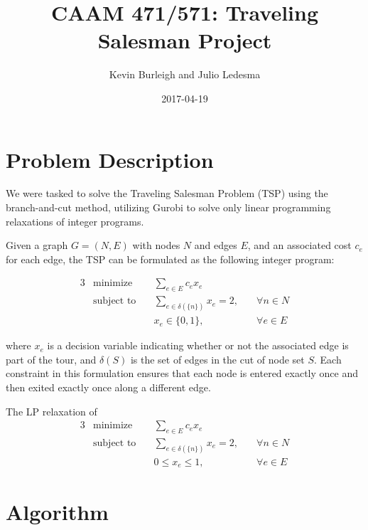 \documentclass{article}
\title{CAAM 471/571: Traveling Salesman Project}
\date{2017-04-19}
\author{Kevin Burleigh and Julio Ledesma}
\begin{document}
\maketitle


\section{Problem Description}
We were tasked
to solve the Traveling Salesman Problem (TSP)
using the branch-and-cut method,
utilizing Gurobi
to solve only linear programming relaxations of integer programs.

Given a graph $G = (N,E)$ with nodes $N$ and edges $E$,
and an associated cost $c_e$ for each edge,
the TSP can be formulated
as the following integer program:

\begin{alignat*}{3}
 & \text{minimize}         & \sum_{e \in E}{c_e x_e} & \\
 & \text{subject to} \quad & \sum_{e \in \delta(\{n\})}{x_e} = 2, \quad & \forall n \in N \\
 &                         & x_e \in \{ 0,1 \}, \quad                     & \forall e \in E
\end{alignat*}

where $x_e$ is a decision variable
indicating whether or not
the associated edge is part of the tour,
and $\delta(S)$ is the set of edges
in the cut of node set $S$.
Each constraint in this formulation
ensures that each node
is entered exactly once
and then exited exactly once
along a different edge.

The LP relaxation of
\begin{alignat*}{3}
 & \text{minimize}         & \sum_{e \in E}{c_e x_e} & \\
 & \text{subject to} \quad & \sum_{e \in \delta(\{n\})}{x_e} = 2, \quad & \forall n \in N \\
 &                         & 0 \leq x_e \leq 1, \quad                     & \forall e \in E
\end{alignat*}

\section{Algorithm}
\end{document}
